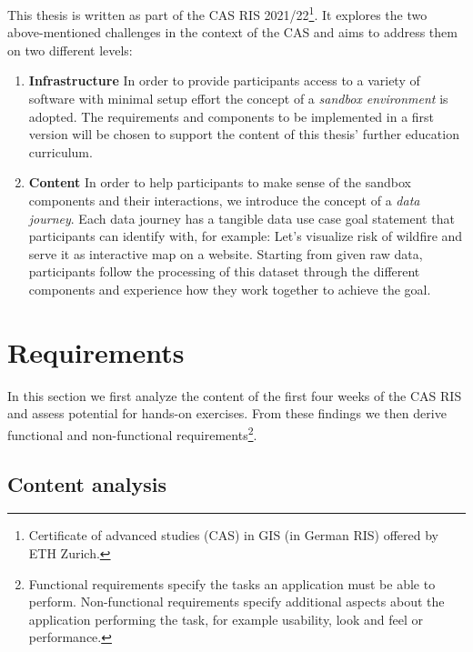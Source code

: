 \documentclass[11pt, a4paper, oneside, parskip=full-]{scrartcl}
\begin{document}
This thesis is written as part of the CAS RIS 2021/22\footnote{Certificate of
advanced studies (CAS) in GIS (in German RIS) offered by ETH Zurich.}. It
explores the two above-mentioned challenges in the context of the CAS and aims
to address them on two different levels:
\begin{enumerate}
  \item \textbf{Infrastructure} In order to provide participants access to a
  variety of software with minimal setup effort the concept of a \emph{sandbox
  environment} is adopted. The requirements and components to be implemented in
  a first version will be chosen to support the content of this thesis' further
  education curriculum.
  \item \textbf{Content} In order to help participants to make sense of the
  sandbox components and their interactions, we introduce the concept of a
  \emph{data journey}. Each data journey has a tangible data use case goal
  statement that participants can identify with, for example: Let's visualize
  risk of wildfire and serve it as interactive map on a website. Starting from
  given raw data, participants follow the processing of this dataset through the
  different components and experience how they work together to achieve the
  goal.
\end{enumerate}


\section{Requirements}
In this section we first analyze the content of the first four weeks of the CAS
RIS and assess potential for hands-on exercises. From these findings we then
derive functional and non-functional requirements\footnote{Functional
requirements specify the tasks an application must be able to perform.
Non-functional requirements specify additional aspects about the application
performing the task, for example usability, look and feel or performance. }.

\subsection{Content analysis}
\end{document}
